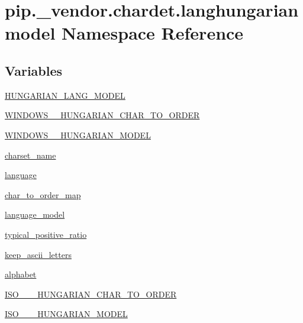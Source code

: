 \hypertarget{namespacepip_1_1__vendor_1_1chardet_1_1langhungarianmodel}{}\section{pip.\+\_\+vendor.\+chardet.\+langhungarianmodel Namespace Reference}
\label{namespacepip_1_1__vendor_1_1chardet_1_1langhungarianmodel}
\subsection*{Variables}
\begin{DoxyCompactItemize}
\item 
\hyperlink{namespacepip_1_1__vendor_1_1chardet_1_1langhungarianmodel_a640aa6e642c93be6a9f36387a34cafc3}{H\+U\+N\+G\+A\+R\+I\+A\+N\+\_\+\+L\+A\+N\+G\+\_\+\+M\+O\+D\+EL}
\item 
\hyperlink{namespacepip_1_1__vendor_1_1chardet_1_1langhungarianmodel_aad1a431a8fc976cfc26a4b00cd89465b}{W\+I\+N\+D\+O\+W\+S\+\_\+\_\+\+H\+U\+N\+G\+A\+R\+I\+A\+N\+\_\+\+C\+H\+A\+R\+\_\+\+T\+O\+\_\+\+O\+R\+D\+ER}
\item 
\hyperlink{namespacepip_1_1__vendor_1_1chardet_1_1langhungarianmodel_a3c2b8a385febeac909cb094d8bdf7913}{W\+I\+N\+D\+O\+W\+S\+\_\+\_\+\+H\+U\+N\+G\+A\+R\+I\+A\+N\+\_\+\+M\+O\+D\+EL}
\item 
\hyperlink{namespacepip_1_1__vendor_1_1chardet_1_1langhungarianmodel_ad3600a4c4d4b369e173b0f56c462a249}{charset\+\_\+name}
\item 
\hyperlink{namespacepip_1_1__vendor_1_1chardet_1_1langhungarianmodel_abb488381d0040c6ebed751cc2a3d4bef}{language}
\item 
\hyperlink{namespacepip_1_1__vendor_1_1chardet_1_1langhungarianmodel_a1d6c9be34767070784396ad45fe0b2b9}{char\+\_\+to\+\_\+order\+\_\+map}
\item 
\hyperlink{namespacepip_1_1__vendor_1_1chardet_1_1langhungarianmodel_ad002e41f49e46a6a6418efb2474acf6d}{language\+\_\+model}
\item 
\hyperlink{namespacepip_1_1__vendor_1_1chardet_1_1langhungarianmodel_ac63246ee4d230d1cefea8bd978310a61}{typical\+\_\+positive\+\_\+ratio}
\item 
\hyperlink{namespacepip_1_1__vendor_1_1chardet_1_1langhungarianmodel_a9bd8bf8ac7b1792b74553b7222c13a23}{keep\+\_\+ascii\+\_\+letters}
\item 
\hyperlink{namespacepip_1_1__vendor_1_1chardet_1_1langhungarianmodel_a38b52a82a151eee9f9f27bd24e9341c7}{alphabet}
\item 
\hyperlink{namespacepip_1_1__vendor_1_1chardet_1_1langhungarianmodel_ac26cbaf4f0627e55775644bb5da48693}{I\+S\+O\+\_\+\_\+\_\+\+H\+U\+N\+G\+A\+R\+I\+A\+N\+\_\+\+C\+H\+A\+R\+\_\+\+T\+O\+\_\+\+O\+R\+D\+ER}
\item 
\hyperlink{namespacepip_1_1__vendor_1_1chardet_1_1langhungarianmodel_a9b9fa4c933e49f5d6ddc407532d5df07}{I\+S\+O\+\_\+\_\+\_\+\+H\+U\+N\+G\+A\+R\+I\+A\+N\+\_\+\+M\+O\+D\+EL}
\end{DoxyCompactItemize}


